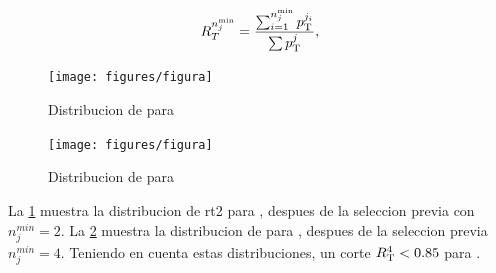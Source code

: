 
\begin{equation}\label{eq:rt_formula}
  R_{T}^{n_{j}^{\min}} = \frac{\sum_{i=1}^{n_{j}^{\min}}p_{\rm T}^{j_i}}{\sum p_{\rm T}^{j}},
\end{equation}




\begin{figure}[th!]
  \centering
  \texttt{[image: figures/figura]} %
  \caption{Distribucion de {\rtt} para {\SRH}}
  \label{fig:RT2_3SR}
\end{figure}

\begin{figure}[th!]
  \centering
  \texttt{[image: figures/figura]} %
  \caption{Distribucion de {\rt} para {\SRL}}
  \label{fig:RT4_3SR}
\end{figure}

La \cref{fig:RT2_3SR} muestra la distribucion de rt2 para {\SRH},
despues de la seleccion previa con $n_{j}^{min}=2$. %
La \cref{fig:RT4_3SR} muestra la distribucion de {\rt} para {\SRL},
despues de la seleccion previa $n_{j}^{min} = 4$.
Teniendo en cuenta estas distribuciones, un corte $R_{\mathrm{T}}^{4} < 0.85$ para {\SRL}.

